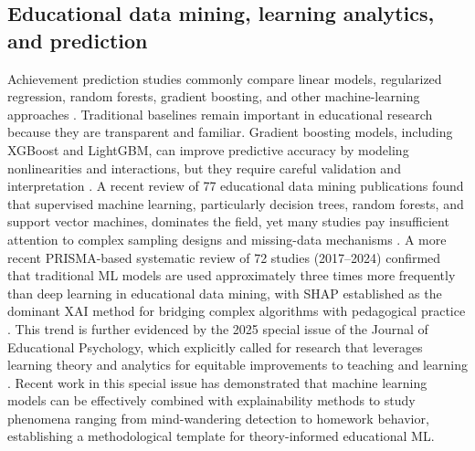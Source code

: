 \documentclass[pdflatex,sn-mathphys-ay]{sn-jnl}
\begin{document}
\subsection{Educational data mining, learning analytics, and prediction}

Achievement prediction studies commonly compare linear models, regularized regression, random forests, gradient boosting, and other machine-learning approaches \citep{Hastie_Tibshirani_Friedman_2009,James_Witten_Hastie_Tibshirani_2021}. Traditional baselines remain important in educational research because they are transparent and familiar. Gradient boosting models, including XGBoost and LightGBM, can improve predictive accuracy by modeling nonlinearities and interactions, but they require careful validation and interpretation \citep{Chen_Guestrin_2016,Ke_2017}. A recent review of 77 educational data mining publications found that supervised machine learning, particularly decision trees, random forests, and support vector machines, dominates the field, yet many studies pay insufficient attention to complex sampling designs and missing-data mechanisms \citep{Ersozlu_2024}. A more recent PRISMA-based systematic review of 72 studies (2017--2024) confirmed that traditional ML models are used approximately three times more frequently than deep learning in educational data mining, with SHAP established as the dominant XAI method for bridging complex algorithms with pedagogical practice \citep{CAEAI_2026_review}. This trend is further evidenced by the 2025 special issue of the Journal of Educational Psychology, which explicitly called for research that leverages learning theory and analytics for equitable improvements to teaching and learning \citep{JEP_2025_special}. Recent work in this special issue has demonstrated that machine learning models can be effectively combined with explainability methods to study phenomena ranging from mind-wandering detection to homework behavior, establishing a methodological template for theory-informed educational ML.
\end{document}
